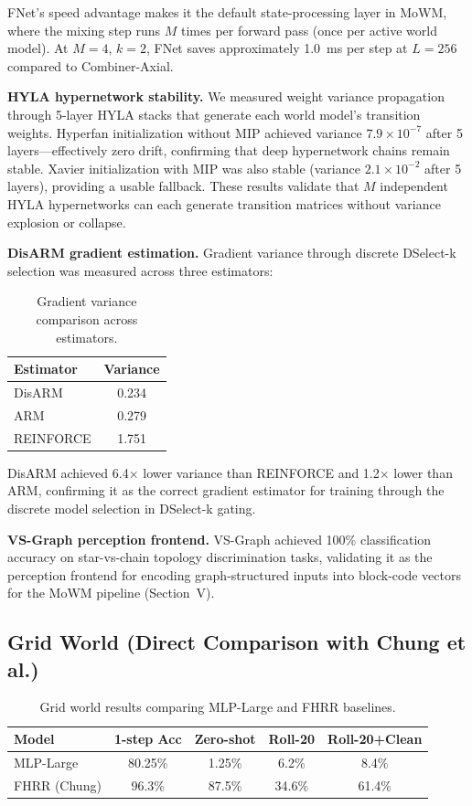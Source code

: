 \documentclass[journal]{IEEEtai}
\begin{document}
FNet's speed advantage makes it the default state-processing layer in MoWM, where the mixing step runs $M$ times per forward pass (once per active world model). At $M=4$, $k=2$, FNet saves approximately 1.0~ms per step at $L=256$ compared to Combiner-Axial.

\textbf{HYLA hypernetwork stability.} We measured weight variance propagation through 5-layer HYLA stacks that generate each world model's transition weights. Hyperfan initialization without MIP achieved variance $7.9 \times 10^{-7}$ after 5 layers---effectively zero drift, confirming that deep hypernetwork chains remain stable. Xavier initialization with MIP was also stable (variance $2.1 \times 10^{-2}$ after 5 layers), providing a usable fallback. These results validate that $M$ independent HYLA hypernetworks can each generate transition matrices without variance explosion or collapse.

\textbf{DisARM gradient estimation.} Gradient variance through discrete DSelect-k selection was measured across three estimators:

\begin{table}[t]
\centering
\caption{Gradient variance comparison across estimators.}
\label{tab:disarm}
\begin{tabular}{lc}
\toprule
Estimator & Variance \\
\midrule
DisARM & 0.234 \\
ARM & 0.279 \\
REINFORCE & 1.751 \\
\bottomrule
\end{tabular}
\end{table}

DisARM achieved 6.4$\times$ lower variance than REINFORCE and 1.2$\times$ lower than ARM, confirming it as the correct gradient estimator for training through the discrete model selection in DSelect-k gating.

\textbf{VS-Graph perception frontend.} VS-Graph achieved 100\% classification accuracy on star-vs-chain topology discrimination tasks, validating it as the perception frontend for encoding graph-structured inputs into block-code vectors for the MoWM pipeline (Section~V).

\subsection{Grid World (Direct Comparison with Chung et al.)}

\begin{table}[t]
\centering
\caption{Grid world results comparing MLP-Large and FHRR baselines.}
\label{tab:gridworld}
\begin{tabular}{lcccc}
\toprule
Model & 1-step Acc & Zero-shot & Roll-20 & Roll-20+Clean \\
\midrule
MLP-Large & 80.25\% & 1.25\% & 6.2\% & 8.4\% \\
FHRR (Chung) & 96.3\% & 87.5\% & 34.6\% & 61.4\% \\
\bottomrule
\end{tabular}
\end{table}
\end{document}
